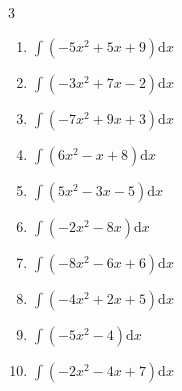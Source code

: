 \begin{multicols}{3}
\begin{enumerate}

\columnbreak %

  \item $\displaystyle \int \left( -5x^{2}+5x+9 \right) \mathrm{d}x$


  \item $\displaystyle \int \left( -3x^{2}+7x-2 \right) \mathrm{d}x$


  \item $\displaystyle \int \left( -7x^{2}+9x+3 \right) \mathrm{d}x$


  \item $\displaystyle \int \left( 6x^{2}-x+8 \right) \mathrm{d}x$


  \item $\displaystyle \int \left( 5x^{2}-3x-5 \right) \mathrm{d}x$


  \item $\displaystyle \int \left( -2x^{2}-8x \right) \mathrm{d}x$


  \item $\displaystyle \int \left( -8x^{2}-6x+6 \right) \mathrm{d}x$


  \item $\displaystyle \int \left( -4x^{2}+2x+5 \right) \mathrm{d}x$


  \item $\displaystyle \int \left( -5x^{2}-4 \right) \mathrm{d}x$


  \item $\displaystyle \int \left( -2x^{2}-4x+7 \right) \mathrm{d}x$


\end{enumerate}
\end{multicols}
